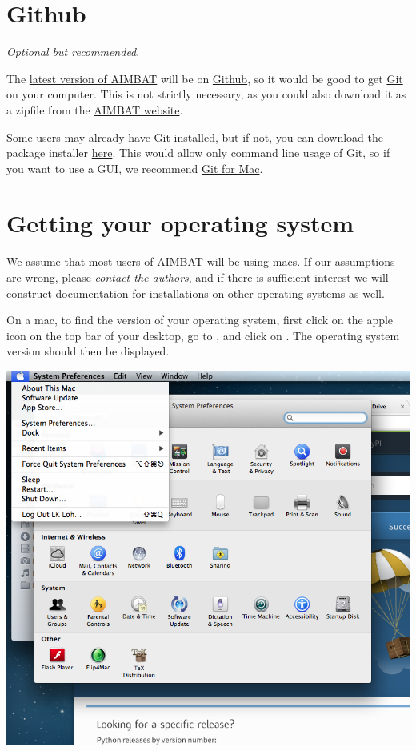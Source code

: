 \documentclass[letterpaper,10pt,english]{sphinxmanual}
\begin{document}
\section{Github}
\label{docfiles/install_dependencies:github}
\emph{Optional but recommended}.

The \href{https://github.com/pysmo}{latest version of AIMBAT} will be on \href{https://github.com/}{Github}, so it would be good to get \href{https://github.com/}{Git} on your computer. This is not strictly necessary, as you could also download it as a zipfile from the \href{http://www.earth.northwestern.edu/~xlou/aimbat.html}{AIMBAT website}.

Some users may already have Git installed, but if not, you can download the package installer \href{http://git-scm.com/download/mac}{here}. This would allow only command line usage of Git, so if you want to use a GUI, we recommend \href{https://mac.github.com/}{Git for Mac}.


\section{Getting your operating system}
\label{docfiles/install_dependencies:getting-your-operating-system}
We assume that most users of AIMBAT will be using macs. If our assumptions are wrong, please {\hyperref[docfiles/introduction:authors-contacts]{\emph{contact the authors}}}, and if there is sufficient interest we will construct documentation for installations on other operating systems as well.

On a mac, to find the version of your operating system, first click on the apple icon on the top bar of your desktop, go to , and click on . The operating system version should then be displayed.

\includegraphics{system_preferences.png}
\end{document}
